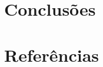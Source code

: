 \documentclass[a4paper, 12pt,brazil]{article}
\begin{document}
\section{Conclusões}

\section{Referências}
    \nocite{*} %
    
\end{document}
